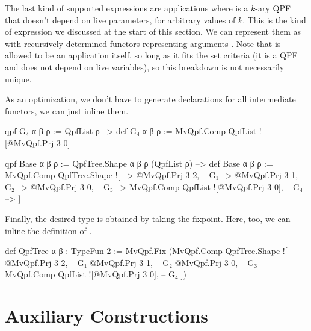 The last kind of supported expressions are applications  where  is a $k$-ary QPF
that doesn't depend on live parameters, for arbitrary values of $k$.
This is the kind of expression we discussed at the start of this section.
We can represent them as  with recursively determined functors representing arguments .
Note that  is allowed to be an application itself, so long as it fits the set criteria (it is a QPF and 
does not depend on live variables), so this breakdown is not necessarily unique.

As an optimization, we don't have to generate  declarations for all intermediate functors, we can just
inline them.
\begin{leancode}
  qpf G₄ α β ρ := QpfList ρ 
    --> def G₄ α β ρ := MvQpf.Comp QpfList ![@MvQpf.Prj 3 0]

  qpf Base α β ρ := QpfTree.Shape α β ρ (QpfList ρ)
    --> def Base α β ρ := MvQpf.Comp QpfTree.Shape ![
    -->     @MvQpf.Prj 3 2,                       -- G₁ 
    -->     @MvQpf.Prj 3 1,                       -- G₂ 
    -->     @MvQpf.Prj 3 0,                       -- G₃
    -->     MvQpf.Comp QpfList ![@MvQpf.Prj 3 0], -- G₄
    --> ]
\end{leancode}



Finally, the desired type is obtained by taking the fixpoint. Here, too, we can inline the definition
of .
\begin{leancode}
  def QpfTree α β : TypeFun 2 :=
    MvQpf.Fix (MvQpf.Comp QpfTree.Shape ![
        @MvQpf.Prj 3 2,                       -- G₁ 
        @MvQpf.Prj 3 1,                       -- G₂ 
        @MvQpf.Prj 3 0,                       -- G₃
        MvQpf.Comp QpfList ![@MvQpf.Prj 3 0], -- G₄
    ])
\end{leancode}




\section{Auxiliary Constructions}%
\label{sec:aux_constructions}

